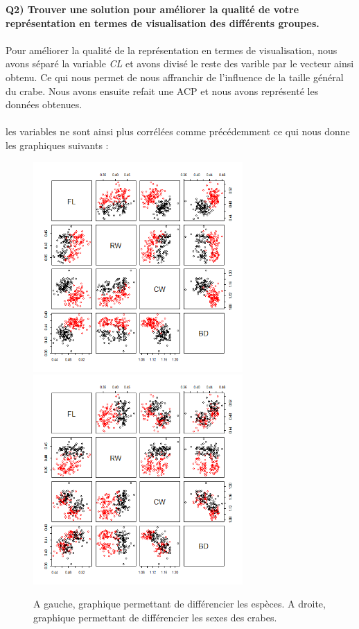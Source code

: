 ﻿\documentclass[a4paper, 9pt]{article}
\begin{document}
\newpage
\textbf{Q2) Trouver une solution pour améliorer la qualité de votre représentation en termes de visualisation des différents groupes.}\\
\\Pour am\'eliorer la qualit\'e de la repr\'esentation en termes de visualisation, nous avons séparé la variable \textit{CL} et avons divisé le reste des varible par le vecteur ainsi obtenu. Ce qui nous permet de nous affranchir de l’influence de la taille général du crabe.
Nous avons ensuite refait une ACP et nous avons repr\'esent\'e les donn\'ees obtenues.\\
 \\ les variables ne sont ainsi plus corr\'el\'ees comme pr\'ec\'edemment ce qui nous donne les graphiques suivants :\\


\begin{figure}[h!]
\includegraphics[height = 8cm, width = 8cm]{plots/plot_crabs_sp_2.png}
\includegraphics[height = 8cm, width = 8cm]{plots/plot_crabs_sex_2.png}
\caption{A gauche, graphique permettant de différencier les espèces. A droite, graphique permettant de différencier les sexes des crabes.}
\end{figure} 
\end{document}
